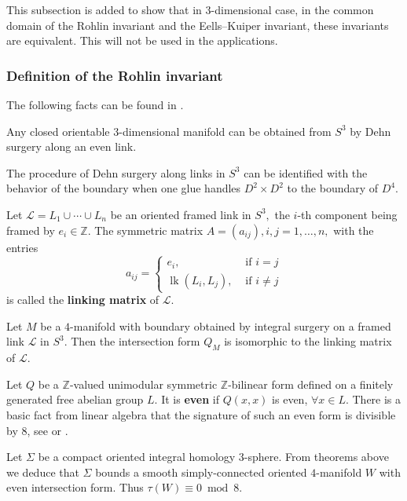 \documentclass[twoside]{article}
\begin{document}
This subsection is added to show that in $3$-dimensional case, in the common domain of the Rohlin invariant and the Eells--Kuiper invariant, these invariants are equivalent. This will not be used in the applications. 

\subsubsection{Definition of the Rohlin invariant}

The following facts can be found in \cite{saveliev}. 

\begin{thm}
	Any closed orientable $3$-dimensional manifold can be obtained from $S^3$ by Dehn surgery along an even link.
\end{thm}

The procedure of Dehn surgery along links in $S^3$ can be identified with the behavior of the boundary when one glue handles $D^2 \times  D^2$ to the boundary of $D^4$. 

Let $\mathscr{L} = L_{1}   \cup   \cdots   \cup   L_{n}$ be an oriented framed link in $S^{3},$ the $i$-th component being framed by $e_{i}  \in   \mathbb{Z} .$ The symmetric matrix $A = (a_{i j}), i, j = 1, \ldots, n,$ with the entries
\[
a_{i j} = \left \{ 
\begin{array}{ll}
e_{i}, & \text { if } i = j \\
\operatorname{lk}(L_{i}, L_{j}), & \text { if } i          \neq   j
\end{array}\right. 
\]
is called the \textbf{linking matrix} of $\mathscr{L}$. 

\begin{thm}
	Let $M$ be a $4$-manifold with boundary obtained by integral surgery on a framed link $\mathscr{L}$ in $S^3$. Then the intersection form $Q_M$ is isomorphic to the linking matrix of $\mathscr{L}$. 
\end{thm}

Let $Q$ be a $\mathbb{Z}$-valued unimodular symmetric $\mathbb{Z}$-bilinear form defined on a finitely generated free abelian group $L$. It is \textbf{even} if $Q(x,x)$ is even, $\forall x\in L$. There is a basic fact from linear algebra that the signature of such an even form is divisible by $8$, see \cite{serre} or \cite{milnorsymmetric}. 




Let $\Sigma$ be a compact oriented integral homology $3$-sphere. From  theorems above we deduce that $\Sigma$ bounds  a smooth simply-connected oriented $4$-manifold $W$ with even intersection form. Thus $\tau(W) \equiv  0\bmod 8$. 
\end{document}
